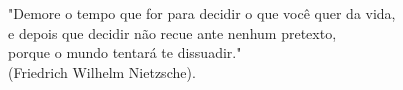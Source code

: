 \begin{epigrafe}
    \vspace*{\fill}
	\begin{flushright}
"Demore o tempo que for para decidir o que você quer da vida,\\e depois que decidir não recue ante nenhum pretexto,\\ porque o mundo tentará te dissuadir."\\
(Friedrich Wilhelm Nietzsche).
	\end{flushright}
\end{epigrafe}
